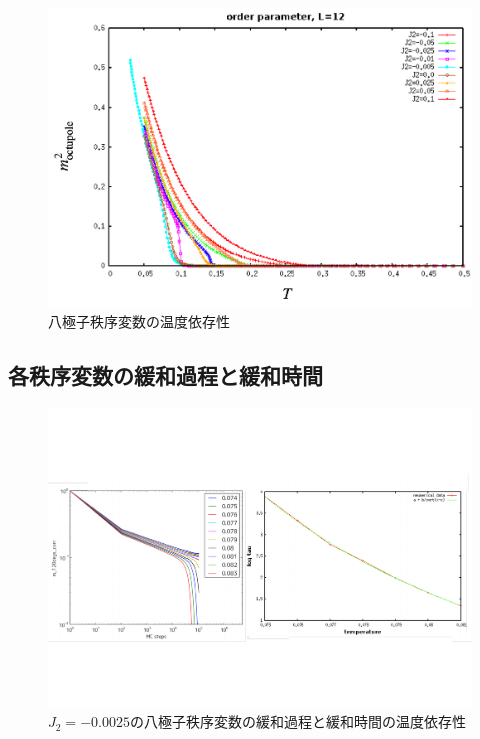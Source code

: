 \documentclass[12pt,titlepage,dvipdfmx]{jarticle}
\begin{document}
\begin{figure}[tbh]
   \centering
   \includegraphics[width=12cm]{figure/octupole_order_params.pdf}
   \caption{八極子秩序変数の温度依存性}
\end{figure}

\subsection{各秩序変数の緩和過程と緩和時間}

\begin{figure}[tbh]
   \centering
   \includegraphics[width=15cm]{figure/relaxation_process_J2_-0.0025.pdf}
   \caption{$J_2=-0.0025$の八極子秩序変数の緩和過程と緩和時間の温度依存性}
\end{figure}
\end{document}
